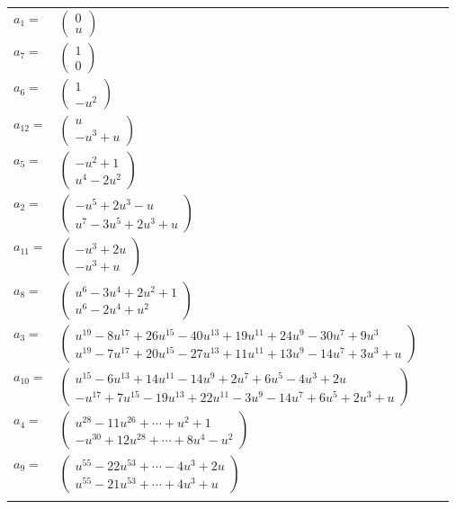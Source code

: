 \documentclass[1p]{elsarticle_modified}
\theoremstyle{definition}
\begin{document}
\begin{tabular}{m{7pt} m{180pt} m{7pt} m{180pt} }
\flushright $a_{1}=$&$\begin{pmatrix}0\\u\end{pmatrix}$ \\
\flushright $a_{7}=$&$\begin{pmatrix}1\\0\end{pmatrix}$ \\
\flushright $a_{6}=$&$\begin{pmatrix}1\\- u^2\end{pmatrix}$ \\
\flushright $a_{12}=$&$\begin{pmatrix}u\\- u^3+u\end{pmatrix}$ \\
\flushright $a_{5}=$&$\begin{pmatrix}- u^2+1\\u^4-2 u^2\end{pmatrix}$ \\
\flushright $a_{2}=$&$\begin{pmatrix}- u^5+2 u^3- u\\u^7-3 u^5+2 u^3+u\end{pmatrix}$ \\
\flushright $a_{11}=$&$\begin{pmatrix}- u^3+2 u\\- u^3+u\end{pmatrix}$ \\
\flushright $a_{8}=$&$\begin{pmatrix}u^6-3 u^4+2 u^2+1\\u^6-2 u^4+u^2\end{pmatrix}$ \\
\flushright $a_{3}=$&$\begin{pmatrix}u^{19}-8 u^{17}+26 u^{15}-40 u^{13}+19 u^{11}+24 u^9-30 u^7+9 u^3\\u^{19}-7 u^{17}+20 u^{15}-27 u^{13}+11 u^{11}+13 u^9-14 u^7+3 u^3+u\end{pmatrix}$ \\
\flushright $a_{10}=$&$\begin{pmatrix}u^{15}-6 u^{13}+14 u^{11}-14 u^9+2 u^7+6 u^5-4 u^3+2 u\\- u^{17}+7 u^{15}-19 u^{13}+22 u^{11}-3 u^9-14 u^7+6 u^5+2 u^3+u\end{pmatrix}$ \\
\flushright $a_{4}=$&$\begin{pmatrix}u^{28}-11 u^{26}+\cdots+u^2+1\\- u^{30}+12 u^{28}+\cdots+8 u^4- u^2\end{pmatrix}$ \\
\flushright $a_{9}=$&$\begin{pmatrix}u^{55}-22 u^{53}+\cdots-4 u^3+2 u\\u^{55}-21 u^{53}+\cdots+4 u^3+u\end{pmatrix}$\\&\end{tabular}
\end{document}
